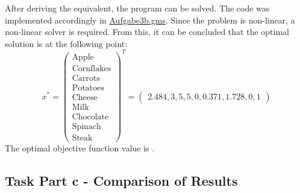\documentclass[a4paper,12pt]{article}
\begin{document}
After deriving the equivalent, the program can be solved. The code was implemented accordingly in \href{../src/r3/Aufgabe3b.gms}{Aufgabe3b.gms}. Since the problem is non-linear, a non-linear solver is required.
From this, it can be concluded that the optimal solution is at the following point:
\[
x^* = \begin{pmatrix}
    \text{Apple} \\ \text{Cornflakes} \\ \text{Carrots} \\ \text{Potatoes} \\ \text{Cheese} \\ \text{Milk} \\ \text{Chocolate} \\ \text{Spinach} \\ \text{Steak}
    \end{pmatrix}^T
     =
     \begin{pmatrix}
        2.484, 3, 5, 5, 0, 0.371, 1.728, 0, 1
        \end{pmatrix}
\]
The optimal objective function value is .

\subsection*{Task Part c - Comparison of Results}
\end{document}
